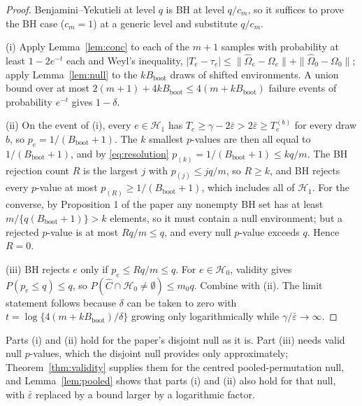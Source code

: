 \documentclass[11pt]{article}
\theoremstyle{remark}
\newcommand{\Hone}{\mathcal{H}_1}
\newcommand{\Hzero}{\mathcal{H}_0}
\newcommand{\Chat}{\widehat C}
\newcommand{\Bb}{B_{\mathrm{boot}}}
\begin{document}
\begin{proof}
Benjamini--Yekutieli at level $q$ is BH at level $q/c_m$, so it suffices to prove the BH case ($c_m=1$) at a generic level and substitute $q/c_m$.

(i) Apply Lemma~\ref{lem:conc} to each of the $m+1$ samples with probability at least $1-2e^{-t}$ each and Weyl's inequality, $|T_e-\tau_e|\le\|\widehat\Omega_e-\Omega_e\|+\|\widehat\Omega_0-\Omega_0\|$; apply Lemma~\ref{lem:null} to the $k\Bb$ draws of shifted environments. A union bound over at most $2(m+1)+4k\Bb\le 4(m+k\Bb)$ failure events of probability $e^{-t}$ gives $1-\delta$.

(ii) On the event of (i), every $e\in\Hone$ has $T_e\ge\gamma-2\bar\varepsilon>2\bar\varepsilon\ge T^{(b)}_e$ for every draw $b$, so $p_e=1/(\Bb+1)$. The $k$ smallest $p$-values are then all equal to $1/(\Bb+1)$, and by \eqref{eq:resolution} $p_{(k)}=1/(\Bb+1)\le kq/m$. The BH rejection count $R$ is the largest $j$ with $p_{(j)}\le jq/m$, so $R\ge k$, and BH rejects every $p$-value at most $p_{(R)}\ge1/(\Bb+1)$, which includes all of $\Hone$. For the converse, by Proposition 1 of the paper any nonempty BH set has at least $m/\{q(\Bb+1)\}>k$ elements, so it must contain a null environment; but a rejected $p$-value is at most $Rq/m\le q$, and every null $p$-value exceeds $q$. Hence $R=0$.

(iii) BH rejects $e$ only if $p_e\le Rq/m\le q$. For $e\in\Hzero$, validity gives $P(p_e\le q)\le q$, so $P(\Chat\cap\Hzero\ne\emptyset)\le m_0q$. Combine with (ii). The limit statement follows because $\delta$ can be taken to zero with $t=\log\{4(m+k\Bb)/\delta\}$ growing only logarithmically while $\gamma/\bar\varepsilon\to\infty$.
\end{proof}

Parts (i) and (ii) hold for the paper's disjoint null as it is. Part (iii) needs valid null $p$-values, which the disjoint null provides only approximately; Theorem~\ref{thm:validity} supplies them for the centred pooled-permutation null, and Lemma~\ref{lem:pooled} shows that parts (i) and (ii) also hold for that null, with $\bar\varepsilon$ replaced by a bound larger by a logarithmic factor.
\end{document}
